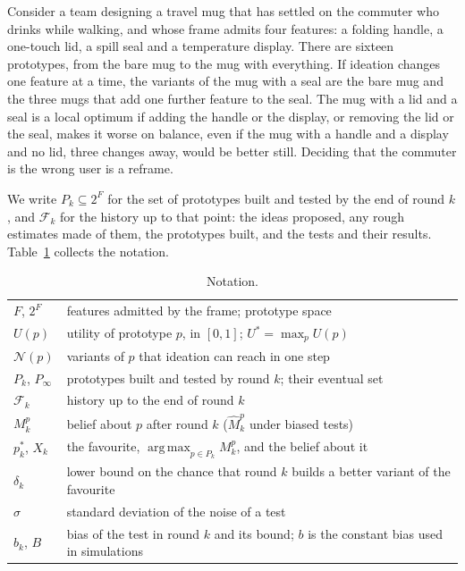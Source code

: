 \documentclass[10pt,twocolumn]{article}
\DeclareMathOperator*{\argmax}{arg\,max}
\newcommand{\filt}{\mathcal{F}}
\newcommand{\Nb}{\mathcal{N}}
\newcommand{\Pk}{P_k}
\theoremstyle{definition}
\begin{document}
Consider a team designing a travel mug that has settled on the commuter who drinks while walking, and whose frame admits four features: a folding handle, a one-touch lid, a spill seal and a temperature display. There are sixteen prototypes, from the bare mug to the mug with everything. If ideation changes one feature at a time, the variants of the mug with a seal are the bare mug and the three mugs that add one further feature to the seal. The mug with a lid and a seal is a local optimum if adding the handle or the display, or removing the lid or the seal, makes it worse on balance, even if the mug with a handle and a display and no lid, three changes away, would be better still. Deciding that the commuter is the wrong user is a reframe.

We write $\Pk\subseteq 2^F$ for the set of prototypes built and tested by the end of round $k$, and $\filt_k$ for the history up to that point: the ideas proposed, any rough estimates made of them, the prototypes built, and the tests and their results. Table~\ref{tab:notation} collects the notation.

\begin{table}[t]
\caption{Notation.}
\label{tab:notation}
\small
\begin{tabularx}{\columnwidth}{@{}lX@{}}
\toprule
$F$, $2^F$ & features admitted by the frame; prototype space\\
$U(p)$ & utility of prototype $p$, in $[0,1]$; $U^*=\max_p U(p)$\\
$\Nb(p)$ & variants of $p$ that ideation can reach in one step\\
$\Pk$, $P_\infty$ & prototypes built and tested by round $k$; their eventual set\\
$\filt_k$ & history up to the end of round $k$\\
$M^p_k$ & belief about $p$ after round $k$ ($\widehat M^p_k$ under biased tests)\\
$p^*_k$, $X_k$ & the favourite, $\argmax_{p\in \Pk}M^p_k$, and the belief about it\\
$\delta_k$ & lower bound on the chance that round $k$ builds a better variant of the favourite\\
$\sigma$ & standard deviation of the noise of a test\\
$b_k$, $B$ & bias of the test in round $k$ and its bound; $b$ is the constant bias used in simulations\\
\bottomrule
\end{tabularx}
\end{table}
\end{document}
